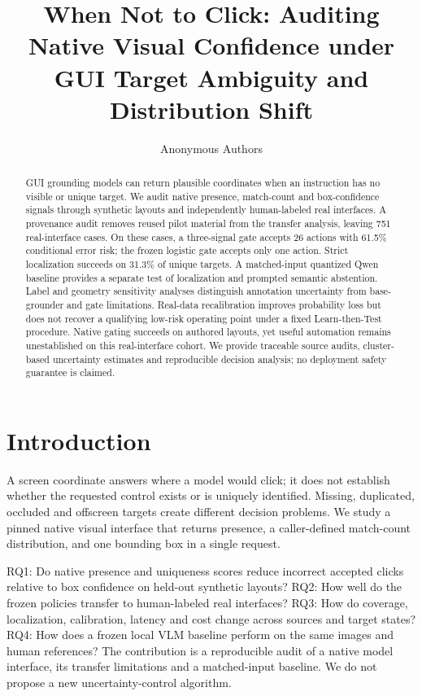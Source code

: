 \documentclass[10pt]{article}
\title{When Not to Click: Auditing Native Visual Confidence under GUI Target Ambiguity and Distribution Shift}
\author{Anonymous Authors}
\date{}
\begin{document}
\maketitle\thispagestyle{plain}
\begin{abstract}
GUI grounding models can return plausible coordinates when an instruction has no visible or unique target. We audit native presence, match-count and box-confidence signals through synthetic layouts and independently human-labeled real interfaces. A provenance audit removes reused pilot material from the transfer analysis, leaving 751 real-interface cases. On these cases, a three-signal gate accepts 26 actions with 61.5\% conditional error risk; the frozen logistic gate accepts only one action. Strict localization succeeds on 31.3\% of unique targets. A matched-input quantized Qwen baseline provides a separate test of localization and prompted semantic abstention. Label and geometry sensitivity analyses distinguish annotation uncertainty from base-grounder and gate limitations. Real-data recalibration improves probability loss but does not recover a qualifying low-risk operating point under a fixed Learn-then-Test procedure. Native gating succeeds on authored layouts, yet useful automation remains unestablished on this real-interface cohort. We provide traceable source audits, cluster-based uncertainty estimates and reproducible decision analysis; no deployment safety guarantee is claimed.
\end{abstract}
\section*{Introduction}
A screen coordinate answers where a model would click; it does not establish whether the requested control exists or is uniquely identified. Missing, duplicated, occluded and offscreen targets create different decision problems. We study a pinned native visual interface that returns presence, a caller-defined match-count distribution, and one bounding box in a single request.

RQ1: Do native presence and uniqueness scores reduce incorrect accepted clicks relative to box confidence on held-out synthetic layouts? RQ2: How well do the frozen policies transfer to human-labeled real interfaces? RQ3: How do coverage, localization, calibration, latency and cost change across sources and target states? RQ4: How does a frozen local VLM baseline perform on the same images and human references? The contribution is a reproducible audit of a native model interface, its transfer limitations and a matched-input baseline. We do not propose a new uncertainty-control algorithm.
\end{document}
